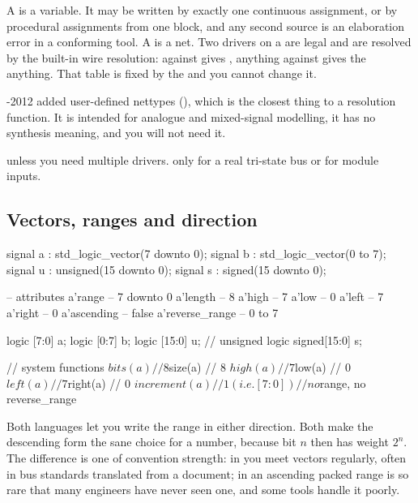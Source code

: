 A  is a variable. It may be written by exactly one continuous
assignment, or by procedural assignments from one  block, and any
second source is an elaboration error in a conforming tool. A  is a
net. Two drivers on a  are legal and are resolved by the built-in wire
resolution:  against  gives , anything against
 gives the anything. That table is fixed by the \LRM{} and you cannot
change it.

\SV{}-2012 added user-defined nettypes (),
which is the closest thing to a \VHDL{} resolution function. It is intended for
analogue and mixed-signal modelling, it has no synthesis meaning, and you will
not need it.

\begin{ruleofthumb}
 unless you need multiple drivers.  only for a real
tri-state bus or for module inputs.
\end{ruleofthumb}

\subsection{Vectors, ranges and direction}

\begin{rosetta}
\begin{rleft}
signal a : std_logic_vector(7 downto 0);
signal b : std_logic_vector(0 to 7);
signal u : unsigned(15 downto 0);
signal s : signed(15 downto 0);

-- attributes
a'range          -- 7 downto 0
a'length         -- 8
a'high           -- 7
a'low            -- 0
a'left           -- 7
a'right          -- 0
a'ascending      -- false
a'reverse_range  -- 0 to 7
\end{rleft}
\begin{rright}
logic        [7:0] a;
logic        [0:7] b;
logic       [15:0] u;   // unsigned
logic signed[15:0] s;

// system functions
$bits(a)     // 8
$size(a)     // 8
$high(a)     // 7
$low(a)      // 0
$left(a)     // 7
$right(a)    // 0
$increment(a)// 1 (i.e. [7:0])
// no $range, no reverse_range
\end{rright}
\end{rosetta}


Both languages let you write the range in either direction. Both make the
descending form the sane choice for a number, because bit $n$ then has weight
$2^n$. The difference is one of convention strength: in \VHDL{} you meet
 vectors regularly, often in bus standards translated from a
document; in \SV{} an ascending packed range is so rare that many engineers
have never seen one, and some tools handle it poorly.


